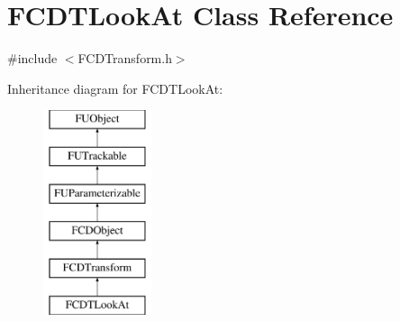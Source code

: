 \hypertarget{classFCDTLookAt}{
\section{FCDTLookAt Class Reference}
\label{classFCDTLookAt}
}


{\ttfamily \#include $<$FCDTransform.h$>$}

Inheritance diagram for FCDTLookAt:\begin{figure}[H]
\begin{center}
\leavevmode
\includegraphics[height=6.000000cm]{classFCDTLookAt}
\end{center}
\end{figure}

